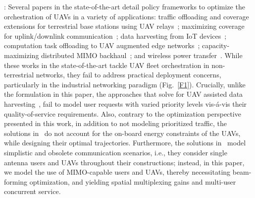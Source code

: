 \documentclass[10pt, twocolumn]{IEEEtran}
\begin{document}
: Several papers in the state-of-the-art detail policy frameworks to optimize the orchestration of UAVs in a variety of applications: traffic offloading and coverage extensions for terrestrial base stations using UAV relays~\cite{MAESTRO_TCCN}; maximizing coverage for uplink/downlink communication~\cite{Core_SoA_1_Ref_13, Core_SoA_1_Ref_14}; data harvesting from IoT devices~\cite{Core_SoA_1_Ref_12, Core_SoA_1_Ref_18_Extended_From_17, Core_SoA_1_Ref_25}; computation task offloading to UAV augmented edge networks~\cite{Core_SoA_1, Core_SoA_1_Ref_24}; capacity-maximizing distributed MIMO backhaul~\cite{CORES_ICASSP, CORES_JSAC}; and wireless power transfer~\cite{Core_SoA_1_Ref_27_Related_To_26}. While these works in the state-of-the-art tackle UAV fleet orchestration in non-terrestrial networks, they fail to address practical deployment concerns, particularly in the industrial networking paradigm (Fig.~\ref{F1}). Crucially, unlike the formulation in this paper, the approaches that solve for UAV assisted data harvesting~\cite{Core_SoA_1_Ref_12, Core_SoA_1_Ref_18_Extended_From_17, Core_SoA_1_Ref_25}, fail to model user requests with varied priority levels vis-\'{a}-vis their quality-of-service requirements. Also, contrary to the optimization perspective presented in this work, in addition to not modeling prioritized traffic, the solutions in~\cite{Core_SoA_1, Core_SoA_1_Ref_24, CORES_ICASSP, CORES_JSAC, Core_SoA_1_Ref_27_Related_To_26} do not account for the on-board energy constraints of the UAVs, while designing their optimal trajectories. Furthermore, the solutions in~\cite{MAESTRO_TCCN, Core_SoA_1_Ref_13, Core_SoA_1_Ref_14} model simplistic and obsolete communication scenarios, i.e., they consider single antenna users and UAVs throughout their constructions; instead, in this paper, we model the use of MIMO-capable users and UAVs, thereby necessitating beam-forming optimization, and yielding spatial multiplexing gains and multi-user concurrent service.
\end{document}
